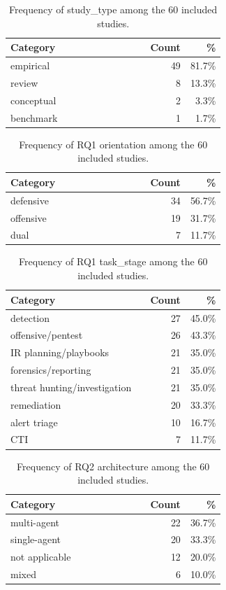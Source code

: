 \begin{table}[tbp]
\centering
\caption{Frequency of study\_type among the 60 included studies.}
\begin{tabular}{@{}p{0.65\linewidth}rr@{}}
\hline
Category & Count & \% \\
\hline
empirical & 49 & 81.7\% \\
review & 8 & 13.3\% \\
conceptual & 2 & 3.3\% \\
benchmark & 1 & 1.7\% \\
\hline
\end{tabular}
\end{table}

\begin{table}[tbp]
\centering
\caption{Frequency of RQ1 orientation among the 60 included studies.}
\begin{tabular}{@{}p{0.65\linewidth}rr@{}}
\hline
Category & Count & \% \\
\hline
defensive & 34 & 56.7\% \\
offensive & 19 & 31.7\% \\
dual & 7 & 11.7\% \\
\hline
\end{tabular}
\end{table}

\begin{table}[tbp]
\centering
\caption{Frequency of RQ1 task\_stage among the 60 included studies.}
\begin{tabular}{@{}p{0.65\linewidth}rr@{}}
\hline
Category & Count & \% \\
\hline
detection & 27 & 45.0\% \\
offensive/pentest & 26 & 43.3\% \\
IR planning/playbooks & 21 & 35.0\% \\
forensics/reporting & 21 & 35.0\% \\
threat hunting/investigation & 21 & 35.0\% \\
remediation & 20 & 33.3\% \\
alert triage & 10 & 16.7\% \\
CTI & 7 & 11.7\% \\
\hline
\end{tabular}
\end{table}

\begin{table}[tbp]
\centering
\caption{Frequency of RQ2 architecture among the 60 included studies.}
\begin{tabular}{@{}p{0.65\linewidth}rr@{}}
\hline
Category & Count & \% \\
\hline
multi-agent & 22 & 36.7\% \\
single-agent & 20 & 33.3\% \\
not applicable & 12 & 20.0\% \\
mixed & 6 & 10.0\% \\
\hline
\end{tabular}
\end{table}

